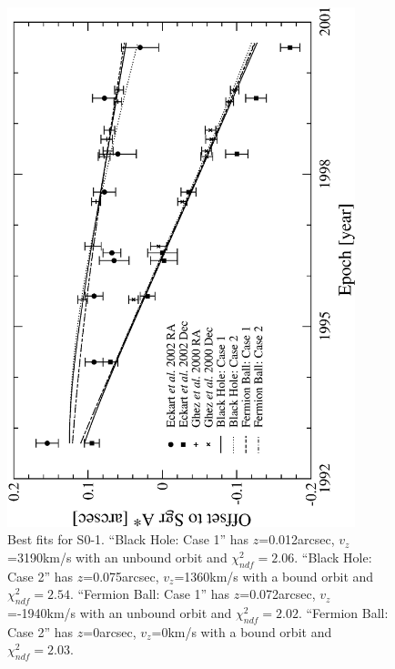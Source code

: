 \begin{figure}[!p]
	\begin{center}
	\includegraphics[angle=-90,width=0.9\textwidth]{eps/bestfits-so1.eps}
	\caption{Best fits for S0-1.
	``Black Hole: Case 1'' has $z$=0.012arcsec, $v_z$=3190km/s with an unbound orbit and $\chi^2_{ndf}=2.06$.
	``Black Hole: Case 2'' has $z$=0.075arcsec, $v_z$=1360km/s with a bound orbit and $\chi^2_{ndf}=2.54$.
	``Fermion Ball: Case 1'' has $z$=0.072arcsec, $v_z$=-1940km/s with an unbound orbit and $\chi^2_{ndf}=2.02$.
	``Fermion Ball: Case 2'' has $z$=0arcsec, $v_z$=0km/s with a bound orbit and $\chi^2_{ndf}=2.03$.}
	\label{fig_so1bestfits}
	\end{center}
\end{figure}
